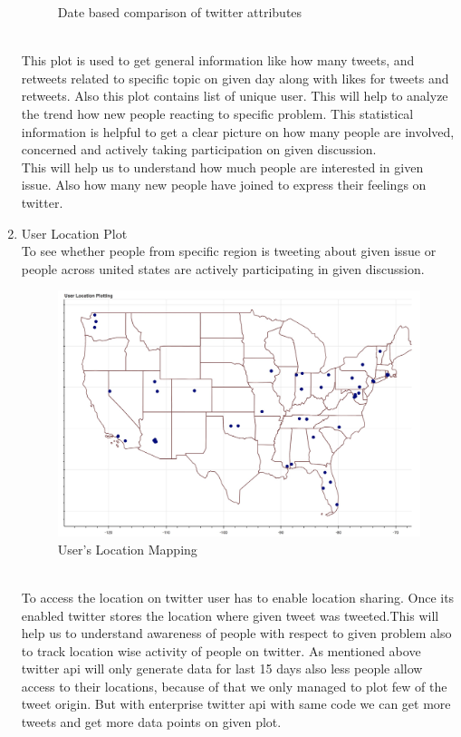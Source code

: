 \documentclass[journal, a4paper]{IEEEtran}
\begin{document}
\begin{enumerate}
\begin{figure}[!hbt]
\begin{center}
		\caption{Date based comparison of twitter attributes}		
		\label{fig:tf_plot}
		\end{center}
	\end{figure}
    \\This plot is used to get general information like how many tweets, and retweets related to specific topic on given day along with likes for tweets and retweets. Also this plot contains list of unique user. This will help to analyze  the trend how new people reacting to specific problem. This statistical information is helpful to get a clear picture on how many people are involved, concerned and actively taking participation on given discussion.
\\This will help us to understand how much people are interested in given issue. Also how many new people have joined to express their feelings on twitter. 

    \item User Location Plot\\ To see whether people from specific region is tweeting about given issue or people across united states are actively participating in given discussion.
    \begin{figure}[!hbt]		
		\begin{center}		
		\includegraphics[width=\columnwidth]{Screen_Shot_2018-05-01_at_7_17_59_PM}
		\caption{User's Location Mapping}		
		\label{fig:tf_plot}
		\end{center}
	\end{figure}
    \\To access the location on twitter user has to enable location sharing. Once its enabled twitter stores the location where given tweet was tweeted.This will help us to understand awareness of people with respect to given problem also to track location wise activity of people on twitter. 
As mentioned above twitter api will only generate data for last 15 days also less people allow access to their locations, because of that we only managed to plot few of the tweet origin. But with enterprise twitter api with same code we can get more tweets and get more data points on given plot.


\end{enumerate}
\end{document}
